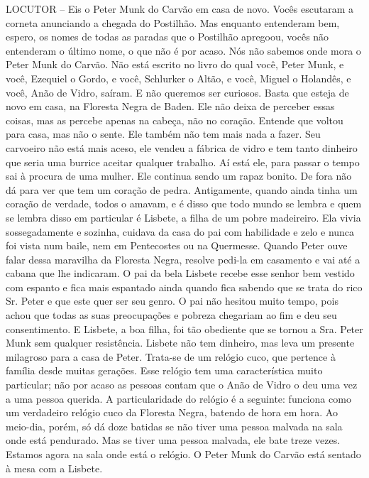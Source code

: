 LOCUTOR -- Eis o Peter Munk do Carvão em casa de novo. Vocês escutaram a
corneta anunciando a chegada do Postilhão. Mas enquanto entenderam bem,
espero, os nomes de todas as paradas que o Postilhão apregoou, vocês não
entenderam o último nome, o que não é por acaso. Nós não sabemos onde
mora o Peter Munk do Carvão. Não está escrito no livro do qual você,
Peter Munk, e você, Ezequiel o Gordo, e você, Schlurker o Altão, e você,
Miguel o Holandês, e você, Anão de Vidro, saíram. E não queremos ser
curiosos. Basta que esteja de novo em casa, na Floresta Negra de Baden.
Ele não deixa de perceber essas coisas, mas as percebe apenas na cabeça,
não no coração. Entende que voltou para casa, mas não o sente. Ele
também não tem mais nada a fazer. Seu carvoeiro não está mais aceso, ele
vendeu a fábrica de vidro e tem tanto dinheiro que seria uma burrice
aceitar qualquer trabalho. Aí está ele, para passar o tempo sai à
procura de uma mulher. Ele continua sendo um rapaz bonito. De fora não
dá para ver que tem um coração de pedra. Antigamente, quando ainda tinha
um coração de verdade, todos o amavam, e é disso que todo mundo se
lembra e quem se lembra disso em particular é Lisbete, a filha de um
pobre madeireiro. Ela vivia sossegadamente e sozinha, cuidava da casa do
pai com habilidade e zelo e nunca foi vista num baile, nem em
Pentecostes ou na Quermesse. Quando Peter ouve falar dessa maravilha da
Floresta Negra, resolve pedi-la em casamento e vai até a cabana que lhe
indicaram. O pai da bela Lisbete recebe esse senhor bem vestido com
espanto e fica mais espantado ainda quando fica sabendo que se trata do
rico Sr. Peter e que este quer ser seu genro. O pai não hesitou muito
tempo, pois achou que todas as suas preocupações e pobreza chegariam ao
fim e deu seu consentimento. E Lisbete, a boa filha, foi tão obediente
que se tornou a Sra. Peter Munk sem qualquer resistência. Lisbete não
tem dinheiro, mas leva um presente milagroso para a casa de Peter.
Trata-se de um relógio cuco, que pertence à família desde muitas
gerações. Esse relógio tem uma característica muito particular; não por
acaso as pessoas contam que o Anão de Vidro o deu uma vez a uma pessoa
querida. A particularidade do relógio é a seguinte: funciona como um
verdadeiro relógio cuco da Floresta Negra, batendo de hora em hora. Ao
meio-dia, porém, só dá doze batidas se não tiver uma pessoa malvada na
sala onde está pendurado. Mas se tiver uma pessoa malvada, ele bate
treze vezes. Estamos agora na sala onde está o relógio. O Peter Munk do
Carvão está sentado à mesa com a Lisbete.

